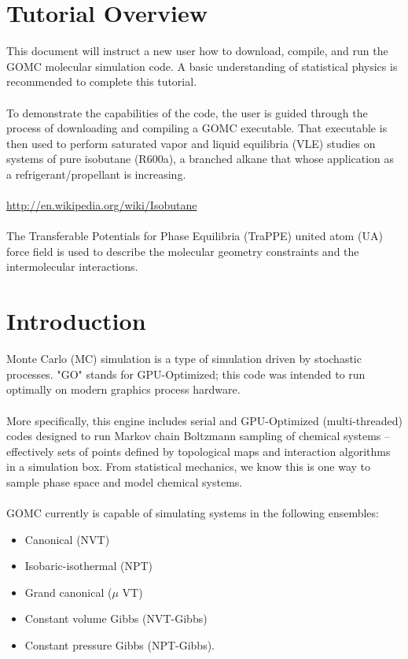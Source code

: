 \section{Tutorial Overview}
This document will instruct a new user how to download, compile, and run the GOMC molecular simulation code.  A basic understanding of statistical physics is recommended to complete this tutorial.\\\\
To demonstrate the capabilities of the code, the user is guided through the process of downloading and compiling a GOMC executable.  That executable is then used to perform saturated vapor and liquid equilibria (VLE) studies on systems of pure isobutane (R600a), a branched alkane that whose application as a refrigerant/propellant is increasing.\\\\
\url{http://en.wikipedia.org/wiki/Isobutane}\\\\
The Transferable Potentials for Phase Equilibria (TraPPE) united atom (UA) force field is used to describe the molecular geometry constraints and the intermolecular interactions.

\section{Introduction}
Monte Carlo (MC) simulation is a type of simulation driven by stochastic processes.  "GO" stands for GPU-Optimized; this code was intended to run optimally on modern graphics process hardware.\\\\
More specifically, this engine includes serial and GPU-Optimized (multi-threaded) codes designed to run Markov chain Boltzmann sampling of chemical systems -- effectively sets of points defined by topological maps and interaction algorithms in a simulation box.  From statistical mechanics, we know this is one way to sample phase space and model chemical systems.\\\\
GOMC currently is capable of simulating systems in the following ensembles: 
\begin{itemize}
	\item Canonical (NVT)
	\item Isobaric-isothermal (NPT)
	\item Grand canonical ($\mu$ VT) 
	\item Constant volume Gibbs (NVT-Gibbs) 
	\item Constant pressure Gibbs (NPT-Gibbs). \\
\end{itemize}

